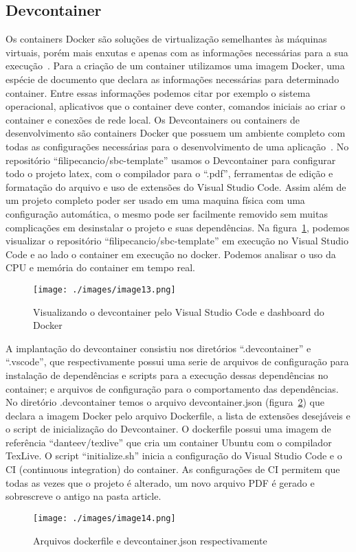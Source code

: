 

\subsection{Devcontainer}
Os containers Docker são soluções de virtualização semelhantes às máquinas virtuais, porém mais enxutas e apenas com as informações necessárias para a sua execução~\cite{vitalino:01}. Para a criação de um container utilizamos uma imagem Docker, uma espécie de documento que declara as informações necessárias para determinado container. Entre essas informações podemos citar por exemplo o sistema operacional, aplicativos que o container deve conter, comandos iniciais ao criar o container e conexões de rede local.
Os Devcontainers ou containers de desenvolvimento são containers Docker que possuem um ambiente completo com todas as configurações necessárias para o desenvolvimento de uma aplicação~\cite{github:01}. No repositório ``filipecancio/sbc-template'' usamos o Devcontainer para configurar todo o projeto latex, com o compilador para o ``.pdf'', ferramentas de edição e formatação do arquivo e uso de extensões do Visual Studio Code. Assim além de um projeto completo poder ser usado em uma maquina física com uma configuração automática, o mesmo pode ser facilmente removido sem muitas complicações em desinstalar o projeto e suas dependências.
Na figura~\ref{fig:image13}, podemos visualizar o repositório ``filipecancio/sbc-template'' em execução no Visual Studio Code e ao lado o container em execução no docker. Podemos analisar o uso da CPU e memória do container em tempo real.

\begin{figure}[ht]
	\centering
	\texttt{[image: ./images/image13.png]}
	\caption{Visualizando o devcontainer pelo Visual Studio Code e dashboard do Docker}
	\label{fig:image13}
\end{figure}

A implantação do devcontainer consistiu nos diretórios ``.devcontainer'' e ``.vscode'', que respectivamente possui uma serie de arquivos de configuração para instalação de dependências e scripts para a execução dessas dependências no container; e arquivos de configuração para o comportamento das dependências.
No diretório .devcontainer temos o arquivo devcontainer.json (figura~\ref{fig:image14}) que declara a imagem Docker pelo arquivo Dockerfile, a lista de extensões desejáveis e o script de inicialização do Devcontainer. O dockerfile possui uma imagem de referência ``danteev/texlive'' que cria um container Ubuntu com o compilador TexLive. O script ``initialize.sh'' inicia a configuração do Visual Studio Code e o CI (continuous integration) do container. As configurações de CI permitem que todas as vezes que o projeto é alterado, um novo arquivo PDF é gerado e sobrescreve o antigo na pasta article.

\begin{figure}[ht]
	\centering
	\texttt{[image: ./images/image14.png]}
	\caption{Arquivos dockerfile e devcontainer.json respectivamente}
	\label{fig:image14}
\end{figure}


